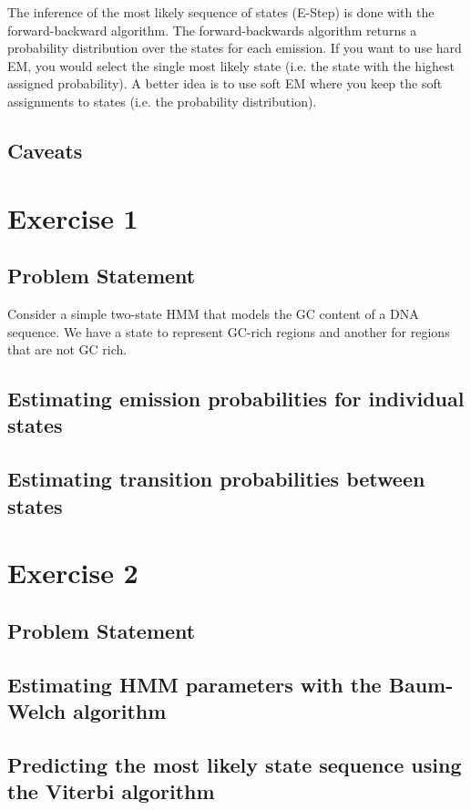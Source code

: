 \documentclass[11pt, oneside]{article}
\begin{document}
The inference of the most likely sequence of states (E-Step) is done with the forward-backward algorithm. The forward-backwards algorithm returns a probability distribution over the states for each emission. If you want to use hard EM, you would select the single most likely state (i.e. the state with the highest assigned probability). A better idea is to use soft EM where you keep the soft assignments to states (i.e. the probability distribution).

\subsection{Caveats}

\section{Exercise 1}
\subsection{Problem Statement}
Consider a simple two-state HMM that models the GC content of a DNA sequence. 
We have a state to represent GC-rich regions and another for regions that are not GC rich.
\subsection{Estimating emission probabilities for individual states}
\subsection{Estimating transition probabilities between states}

\section{Exercise 2}
\subsection{Problem Statement}
\subsection{Estimating HMM parameters with the Baum-Welch algorithm}
\subsection{Predicting the most likely state sequence using the Viterbi algorithm}
\end{document}
